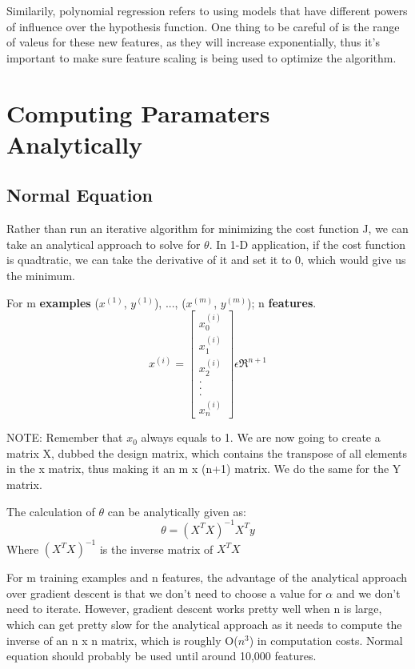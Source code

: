 Similarily, polynomial regression refers to using models that have different powers of influence over the hypothesis function. One thing to be careful of is the range of valeus for these new features, as they will increase exponentially, thus it's important to make sure feature scaling is being used to optimize the algorithm. 

\section{Computing Paramaters Analytically}
\subsection{Normal Equation}
Rather than run an iterative algorithm for minimizing the cost function J, we can take an analytical approach to solve for $\theta$. In 1-D application, if the cost function is quadtratic, we can take the derivative of it and set it to 0, which would give us the minimum. 

For m \textbf{examples} ($x^{(1)}$, $y^{(1)}$), ..., ($x^{(m)}$, $y^{(m)}$); n \textbf{features}.
\begin{equation}
	x^{(i)} =
    \begin{bmatrix}
        x_0^{(i)} \\ x_1^{(i)} \\ x_2^{(i)} \\ . \\ . \\ . \\ x_n^{(i)}
    \end{bmatrix}
    \epsilon  \Re^{n+1}
\end{equation}

NOTE: Remember that $x_0$ always equals to 1. We are now going to create a matrix X, dubbed the design matrix, which contains the transpose of all elements in the x matrix, thus making it an m x (n+1) matrix. We do the same for the Y matrix.

The calculation of $\theta$ can be analytically given as:
\begin{equation}
	\theta = (X^TX)^{-1}X^Ty
\end{equation}
Where $(X^TX)^{-1}$ is the inverse matrix of $X^TX$

For m training examples and n features, the advantage of the analytical approach over gradient descent is that we don't need to choose a value for $\alpha$ and we don't need to iterate. However, gradient descent works pretty well when n is large, which can get pretty slow for the analytical approach as it needs to compute the inverse of an n x n matrix, which is roughly O($n^3$) in computation costs. Normal equation should probably be used until around 10,000 features.

